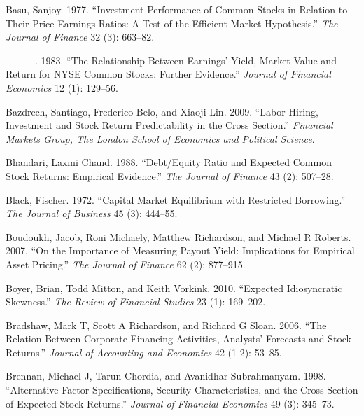 \documentclass[
  letterpaper,
  DIV=11,
  numbers=noendperiod]{scrreprt}
\newlength{\cslhangindent}
\newlength{\cslentryspacingunit} %
\newenvironment{CSLReferences}[2] %
 {%
  \setlength{\parindent}{0pt}
  \ifodd #1
  \let\oldpar\par
  \def\par{\hangindent=\cslhangindent\oldpar}
  \fi
  \setlength{\parskip}{#2\cslentryspacingunit}
 }%
 {}
\begin{document}
\begin{CSLReferences}{1}{0}
\leavevmode{}%
Basu, Sanjoy. 1977. {``Investment Performance of Common Stocks in
Relation to Their Price-Earnings Ratios: A Test of the Efficient Market
Hypothesis.''} \emph{The Journal of Finance} 32 (3): 663--82.

\leavevmode{}%
---------. 1983. {``The Relationship Between Earnings' Yield, Market
Value and Return for NYSE Common Stocks: Further Evidence.''}
\emph{Journal of Financial Economics} 12 (1): 129--56.

\leavevmode{}%
Bazdrech, Santiago, Frederico Belo, and Xiaoji Lin. 2009. {``Labor
Hiring, Investment and Stock Return Predictability in the Cross
Section.''} \emph{Financial Markets Group, The London School of
Economics and Political Science}.

\leavevmode{}%
Bhandari, Laxmi Chand. 1988. {``Debt/Equity Ratio and Expected Common
Stock Returns: Empirical Evidence.''} \emph{The Journal of Finance} 43
(2): 507--28.

\leavevmode{}%
Black, Fischer. 1972. {``Capital Market Equilibrium with Restricted
Borrowing.''} \emph{The Journal of Business} 45 (3): 444--55.

\leavevmode{}%
Boudoukh, Jacob, Roni Michaely, Matthew Richardson, and Michael R
Roberts. 2007. {``On the Importance of Measuring Payout Yield:
Implications for Empirical Asset Pricing.''} \emph{The Journal of
Finance} 62 (2): 877--915.

\leavevmode{}%
Boyer, Brian, Todd Mitton, and Keith Vorkink. 2010. {``Expected
Idiosyncratic Skewness.''} \emph{The Review of Financial Studies} 23
(1): 169--202.

\leavevmode{}%
Bradshaw, Mark T, Scott A Richardson, and Richard G Sloan. 2006. {``The
Relation Between Corporate Financing Activities, Analysts' Forecasts and
Stock Returns.''} \emph{Journal of Accounting and Economics} 42 (1-2):
53--85.

\leavevmode{}%
Brennan, Michael J, Tarun Chordia, and Avanidhar Subrahmanyam. 1998.
{``Alternative Factor Specifications, Security Characteristics, and the
Cross-Section of Expected Stock Returns.''} \emph{Journal of Financial
Economics} 49 (3): 345--73.


\end{CSLReferences}
\end{document}
